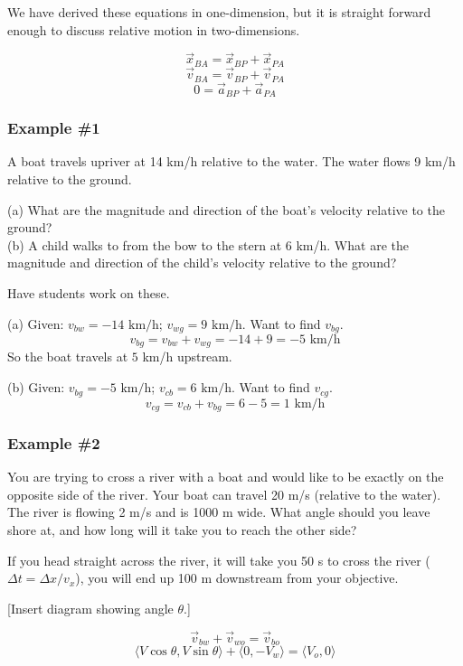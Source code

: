 We have derived these equations in one-dimension, but it is straight forward enough to discuss relative motion in two-dimensions.

$$\vec x_{BA}=\vec x_{BP}+\vec x_{PA}$$
$$\vec v_{BA}=\vec v_{BP}+\vec v_{PA}$$
$$0=\vec a_{BP}+\vec a_{PA}$$

\subsubsection{Example \#1}
A boat travels upriver at 14 km/h relative to the water. The water flows 9 km/h relative to the ground.

(a) What are the magnitude and direction of the boat's velocity relative to the ground?\\
(b) A child walks to from the bow to the stern at 6 km/h. What are the magnitude and direction of the child's velocity relative to the ground?

Have students work on these.

(a) Given: $v_{bw}=-14\mbox{ km/h}$; $v_{wg}=9\mbox{ km/h}$. Want to find $v_{bg}$.
$$v_{bg}=v_{bw}+v_{wg}=-14+9=-5\mbox{ km/h}$$
So the boat travels at $5$ km/h upstream.

(b) Given: $v_{bg}=-5\mbox{ km/h}$; $v_{cb}=6\mbox{ km/h}$. Want to find $v_{cg}$.
$$v_{cg}=v_{cb}+v_{bg}=6-5=1\mbox{ km/h}$$

\subsubsection{Example \#2}
You are trying to cross a river with a boat and would like to be exactly on the opposite side of the river. Your boat can travel 20 m/s (relative to the water). The river is flowing 2 m/s and is 1000 m wide. What angle should you leave shore at, and how long will it take you to reach the other side?

\vspace{5cm}

If you head straight across the river, it will take you 50 s to cross the river ($\Delta{t}=\Delta{x}/v_x$), you will end up 100 m downstream from your objective.

[Insert diagram showing angle $\theta$.]
\vspace{5cm}

$$\vec{v}_{bw}+\vec{v}_{wo}=\vec{v}_{bo}$$
$$\langle{V\cos\theta,V\sin\theta}\rangle+\langle{0,-V_w}\rangle=\langle{V_o,0}\rangle$$

